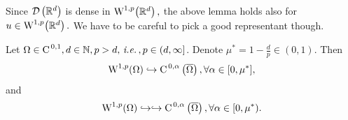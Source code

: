 \documentclass{article}
\begin{document}
\begin{remark}
    Since $\mathcal{D}\!\,\left({\mathbb R}^{d} \right)$ is dense in $\WkpSet[1][p]{\R^{d}},$ the above lemma holds also for $u \in \WkpSet[1][p]{\R^{d}}.$ We have to be careful to pick a good representant though.
\end{remark}



\begin{theorem}
	Let $\Omega \in \text{C}^{\!\,\, 0,1}, d \in {\mathbb N}, p > d, \, \text{\textit{i.e.}} \,, p \in (d, \infty]$. Denote $\mu^{*} = 1 - \frac{d}{p} \in (0,1).$ Then
	\[
		\WkpSet[1][p]{\Omega} \hookrightarrow \CklSet{0}{\alpha}{\overline{\Omega}}, \forall \alpha \in [0,\mu^{*}],
	\]
	and
	\[
		\WkpSet[1][p]{\Omega} \hookrightarrow \hookrightarrow \CklSet{0}{\alpha}{\overline{\Omega}}, \forall \alpha \in [0, \mu^{*}).
	\]
\end{theorem}
\end{document}
